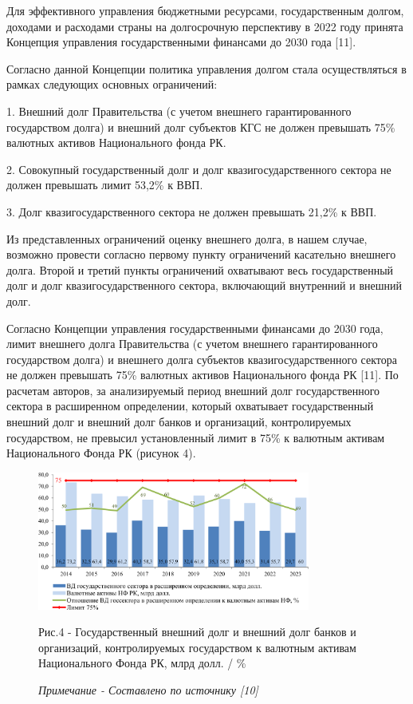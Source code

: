 \begin{multicols}{2}
Для эффективного управления бюджетными ресурсами, государственным
долгом, доходами и расходами страны на долгосрочную перспективу в 2022
году принята Концепция управления государственными финансами до 2030
года {[}11{]}.

Согласно данной Концепции политика управления долгом стала
осуществляться в рамках следующих основных ограничений:

1. Внешний долг Правительства (с учетом внешнего гарантированного
государством долга) и внешний долг субъектов КГС не должен превышать
75\% валютных активов Национального фонда РК.

2. Совокупный государственный долг и долг квазигосударственного сектора
не должен превышать лимит 53,2\% к ВВП.

3. Долг квазигосударственного сектора не должен превышать 21,2\% к ВВП.

Из представленных ограничений оценку внешнего долга, в нашем случае,
возможно провести согласно первому пункту ограничений касательно
внешнего долга. Второй и третий пункты ограничений охватывают весь
государственный долг и долг квазигосударственного сектора, включающий
внутренний и внешний долг.

Согласно Концепции управления государственными финансами до 2030 года,
лимит внешнего долга Правительства (с учетом внешнего гарантированного
государством долга) и внешнего долга субъектов квазигосударственного
сектора не должен превышать 75\% валютных активов Национального фонда РК
{[}11{]}. По расчетам авторов, за анализируемый период внешний долг
государственного сектора в расширенном определении, который охватывает
государственный внешний долг и внешний долг банков и организаций,
контролируемых государством, не превысил установленный лимит в 75\% к
валютным активам Национального Фонда РК (рисунок 4).
\end{multicols}

\begin{figure}[H]
	\centering
	\includegraphics[width=0.8\textwidth]{media/ekon4/image15}
	\caption*{Рис.4 - Государственный внешний долг и внешний долг банков и организаций, контролируемых государством к валютным активам Национального Фонда РК, млрд долл. / \%}
	\caption*{\normalfont\emph{Примечание - Составлено по источнику {[}10{]}}}
\end{figure}

